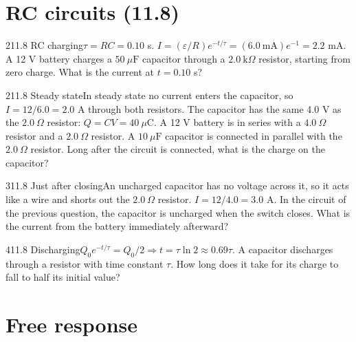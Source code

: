 \documentclass[11pt]{article}
\begin{document}
\section{RC circuits (11.8)}

\begin{q}{2}{11.8 RC charging}{$\tau = RC = 0.10$ s. $I = (\varepsilon/R)e^{-t/\tau} = (6.0\ \mathrm{mA})e^{-1} = 2.2$ mA.}
A 12 V battery charges a $50\ \mu\mathrm{F}$ capacitor through a $2.0\ \mathrm{k}\Omega$ resistor, starting from zero charge. What is the current at $t = 0.10$ s?
\end{q}
\begin{q}{2}{11.8 Steady state}{In steady state no current enters the capacitor, so $I = 12/6.0 = 2.0$ A through both resistors. The capacitor has the same 4.0 V as the $2.0\ \Omega$ resistor: $Q = CV = 40\ \mu\mathrm{C}$.}
A 12 V battery is in series with a $4.0\ \Omega$ resistor and a $2.0\ \Omega$ resistor. A $10\ \mu\mathrm{F}$ capacitor is connected in parallel with the $2.0\ \Omega$ resistor. Long after the circuit is connected, what is the charge on the capacitor?
\end{q}
\begin{q}{3}{11.8 Just after closing}{An uncharged capacitor has no voltage across it, so it acts like a wire and shorts out the $2.0\ \Omega$ resistor. $I = 12/4.0 = 3.0$ A.}
In the circuit of the previous question, the capacitor is uncharged when the switch closes. What is the current from the battery immediately afterward?
\end{q}
\begin{q}{4}{11.8 Discharging}{$Q_0e^{-t/\tau} = Q_0/2 \Rightarrow t = \tau\ln 2 \approx 0.69\tau$.}
A capacitor discharges through a resistor with time constant $\tau$. How long does it take for its charge to fall to half its initial value?
\end{q}

\section{Free response}
\end{document}
